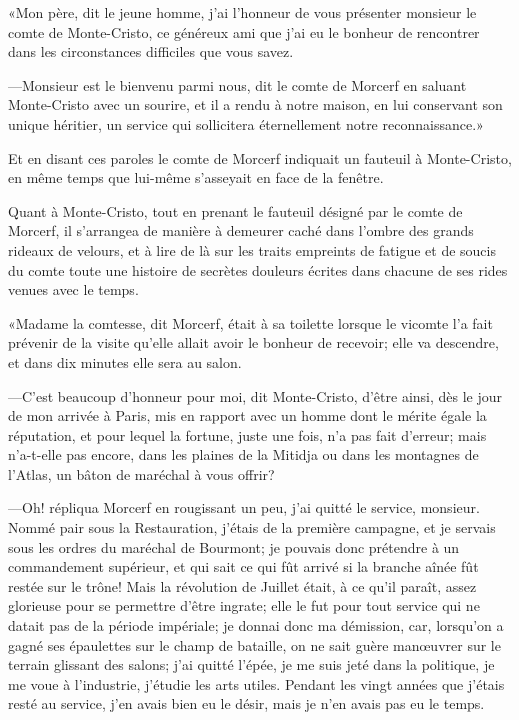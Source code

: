 «Mon père, dit le jeune homme, j'ai l'honneur de vous présenter monsieur le comte de Monte-Cristo, ce généreux ami que j'ai eu le bonheur de rencontrer dans les circonstances difficiles que vous savez. 

—Monsieur est le bienvenu parmi nous, dit le comte de Morcerf en saluant Monte-Cristo avec un sourire, et il a rendu à notre maison, en lui conservant son unique héritier, un service qui sollicitera éternellement notre reconnaissance.» 

Et en disant ces paroles le comte de Morcerf indiquait un fauteuil à Monte-Cristo, en même temps que lui-même s'asseyait en face de la fenêtre.  

Quant à Monte-Cristo, tout en prenant le fauteuil désigné par le comte de Morcerf, il s'arrangea de manière à demeurer caché dans l'ombre des grands rideaux de velours, et à lire de là sur les traits empreints de fatigue et de soucis du comte toute une histoire de secrètes douleurs écrites dans chacune de ses rides venues avec le temps. 

«Madame la comtesse, dit Morcerf, était à sa toilette lorsque le vicomte l'a fait prévenir de la visite qu'elle allait avoir le bonheur de recevoir; elle va descendre, et dans dix minutes elle sera au salon. 

—C'est beaucoup d'honneur pour moi, dit Monte-Cristo, d'être ainsi, dès le jour de mon arrivée à Paris, mis en rapport avec un homme dont le mérite égale la réputation, et pour lequel la fortune, juste une fois, n'a pas fait d'erreur; mais n'a-t-elle pas encore, dans les plaines de la Mitidja ou dans les montagnes de l'Atlas, un bâton de maréchal à vous offrir? 

—Oh! répliqua Morcerf en rougissant un peu, j'ai quitté le service, monsieur. Nommé pair sous la Restauration, j'étais de la première campagne, et je servais sous les ordres du maréchal de Bourmont; je pouvais donc prétendre à un commandement supérieur, et qui sait ce qui fût arrivé si la branche aînée fût restée sur le trône! Mais la révolution de Juillet était, à ce qu'il paraît, assez glorieuse pour se permettre d'être ingrate; elle le fut pour tout service qui ne datait pas de la période impériale; je donnai donc ma démission, car, lorsqu'on a gagné ses épaulettes sur le champ de bataille, on ne sait guère manœuvrer sur le terrain glissant des salons; j'ai quitté l'épée, je me suis jeté dans la politique, je me voue à l'industrie, j'étudie les arts utiles. Pendant les vingt années que j'étais resté au service, j'en avais bien eu le désir, mais je n'en avais pas eu le temps. 

